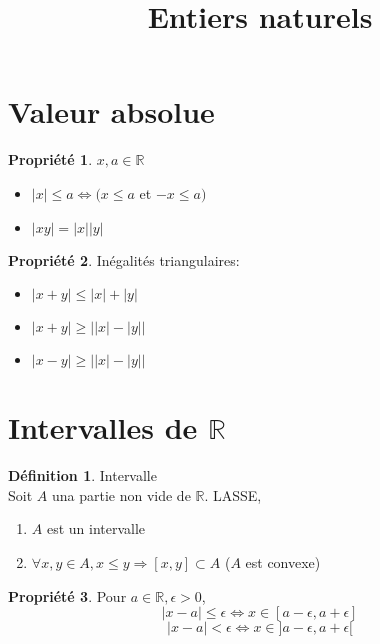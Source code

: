 \documentclass[fleqn]{article}
\title{Entiers naturels}
\date{}
\theoremstyle{definition} \newtheorem*{defi}{D\'efinition}
\theoremstyle{definition} \newtheorem*{theo}{Th\'eor\`eme}
\theoremstyle{definition} \newtheorem*{coro}{Corollaire}
\theoremstyle{remark} \newtheorem*{rqs}{Remarques}
\theoremstyle{definition} \newtheorem*{prop}{Propri\'et\'e}
\begin{document}
\maketitle

\section{Valeur absolue}
\begin{prop} $x,a \in \mathbb{R}$
	\begin{itemize}
		\item $|x| \leq a \Leftrightarrow (x \leq a$ et $-x \leq a)$
		\item $|xy| = |x||y|$
	\end{itemize}
\end{prop}
\begin{prop} In\'egalit\'es triangulaires:
	\begin{itemize}
		\item $|x+y| \leq |x| + |y|$
		\item $|x+y| \geq \big||x| - |y|\big|$
		\item $|x-y| \geq \big||x| - |y|\big|$
	\end{itemize}
\end{prop}

\section{Intervalles de $\mathbb{R}$}
\begin{defi} Intervalle \\
	Soit $A$ una partie non vide de $\mathbb{R}$. LASSE,
	\begin{enumerate}
		\item $A$ est un intervalle
		\item $\forall x,y \in A, x \leq y \Rightarrow [x,y] \subset A$ ($A$ est convexe)
	\end{enumerate}
\end{defi}
\begin{prop}
	Pour $a \in \mathbb{R}, \epsilon > 0$,
	\[|x-a| \leq \epsilon \Leftrightarrow x \in [a - \epsilon, a + \epsilon]\]
	\[|x-a| < \epsilon \Leftrightarrow x \in ]a - \epsilon, a + \epsilon[\]
\end{prop}
\end{document}
